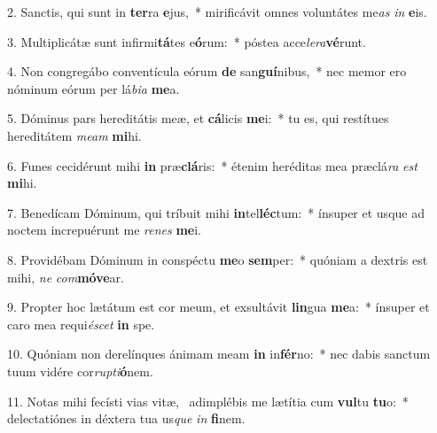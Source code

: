 2. Sanctis, qui sunt in \textbf{ter}ra \textbf{e}jus,~*  mirificávit omnes voluntátes me\textit{as} \textit{in} \textbf{e}is.\

3. Multiplicátæ sunt infirmi\textbf{tá}tes e\textbf{ó}rum:~*  póstea acce\textit{le}\textit{ra}\textbf{vé}runt.\

4. Non congregábo conventícula eórum \textbf{de} san\textbf{guí}nibus,~*  nec memor ero nóminum eórum per lá\textit{bi}\textit{a} \textbf{me}a.\

5. Dóminus pars hereditátis meæ, et \textbf{cá}licis \textbf{me}i:~*  tu es, qui restítues hereditátem \textit{me}\textit{am} \textbf{mi}hi.\

6. Funes cecidérunt mihi \textbf{in} præ\textbf{clá}ris:~*  étenim heréditas mea præclá\textit{ra} \textit{est} \textbf{mi}hi.\

7. Benedícam Dóminum, qui tríbuit mihi \textbf{in}tel\textbf{léc}tum:~*  ínsuper et usque ad noctem increpuérunt me \textit{re}\textit{nes} \textbf{me}i.\

8. Providébam Dóminum in conspéctu \textbf{me}o \textbf{sem}per:~*  quóniam a dextris est mihi, \textit{ne} \textit{com}\textbf{mó}\textbf{ve}ar.\

9. Propter hoc lætátum est cor meum, et exsultávit \textbf{lin}gua \textbf{me}a:~*  ínsuper et caro mea requi\textit{é}\textit{scet} \textbf{in} spe.\

10. Quóniam non derelínques ánimam meam \textbf{in} in\textbf{fér}no:~*  nec dabis sanctum tuum vidére cor\textit{rup}\textit{ti}\textbf{ó}nem.\

11. Notas mihi fecísti vias vitæ, \dag\  adimplébis me lætítia cum \textbf{vul}tu \textbf{tu}o:~*  delectatiónes in déxtera tua us\textit{que} \textit{in} \textbf{fi}nem.\

